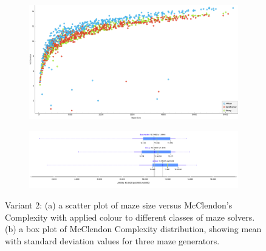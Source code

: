         \begin{figure}[!h]
            \centering
            \begin{subfigure}[!h]{0.4\textwidth}
               \includegraphics[scale =0.15]{McClendonvsSize_variant2.png}
               \caption{}
            \end{subfigure}
            \begin{subfigure}[!h]{0.5\textwidth}
               \includegraphics[width=1\linewidth]{McClendon_variant2.png}
               \caption{}
            \end{subfigure}
            \caption{Variant 2: (a) a scatter plot of maze size versus McClendon's Complexity with applied colour to different classes of maze solvers.
             (b) a box plot of McClendon Complexity distribution, showing mean with standard deviation values for three maze generators.}
            \end{figure}%
\newpage

